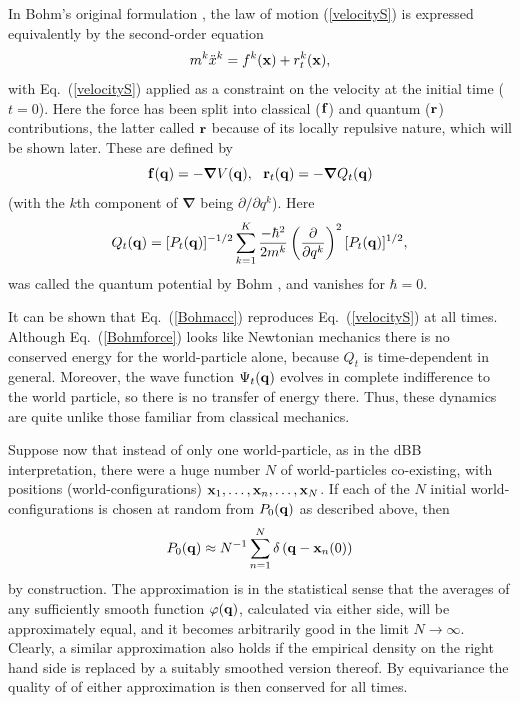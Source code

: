 \documentclass[twocolumn,aps,pra,amsmath,amssymb,superscriptaddress]{revtex4}
\newcommand{\beq}{\begin{equation}}
\newcommand{\eeq}{\end{equation}}
\newcommand{\erf}[1]{Eq.~(\ref{#1})}
\newcommand{\ro}[1]{\left( {#1} \right)}
\renewcommand{\(}{\left(}
\renewcommand{\)}{\right)}
\newcommand{\del}{{\boldsymbol \nabla}}
\newcommand{\du}{\partial}
\newcommand{\dbd}[2]{\frac{\partial{#1}}{\partial{#2}}}
\newcommand{\blk}{\color{black}}
\newcommand{\blu}{\color{blue}}
\renewcommand\blu{\blk}
\begin{document}
 
In Bohm's original formulation \cite{dbb}, the law of motion (\ref{velocityS})  
 is expressed equivalently by the second-order equation 
 \beq
m^k\ddot{x}^k = f^k({\bf x}) + r^k_t({\bf x}),\label{Bohmacc}
\eeq
with \erf{velocityS} applied \blu as \blk a constraint on the velocity at the initial time ($t=0$). \blk 
Here the force has been split into classical (${\bf f}$) and quantum (${\bf r}$)   contributions, 
the latter called ${\bf r}$ because of its locally repulsive nature, which will be shown \blk later. \blk 
These are \blk
 defined by 
\beq
{\bf f}({\bf q})  = - {\del V({\bf q})}, \ \  
{\bf r}_t({\bf q}) =  -{\del  Q_t({\bf q})}   \label{Bohmforce}
\eeq
(with the $k$th component of $\del$ being $\du/{\du q^k}$).
Here 
\beq Q_t({\bf q}) =  [P_{t}({\bf q})]^{-1/2} \sum_{k=1}^K \frac{-\hbar^2}{2m^k} \ro{\dbd{}{q^k}}^2 [P_{t}({\bf q})]^{1/2}, 
\label{eq:quantum-potential} 
\eeq
was called the quantum potential by Bohm \cite{dbb}, \blk and vanishes for $\hbar = 0$. 

It can be shown that \erf{Bohmacc} reproduces \erf{velocityS} at all times. 
Although \erf{Bohmforce} looks like Newtonian mechanics there is no conserved energy for the world-particle  alone, because $Q_t$ is time-dependent in general. Moreover, the wave function $\Psi_{t}({\bf q})$ evolves in complete indifference to the world particle, so there is no transfer of energy there. Thus, these dynamics are quite unlike those familiar from classical mechanics. \blk


Suppose now that instead of only one \blk world-particle, as in the dBB interpretation, 
there  were a huge number ${N}$ of world-particles co-existing, with positions (world-configurations)  
${\bf x}_1, \ldots, {\bf x}_n, \ldots, {\bf x}_N$. If each of the $N$   initial \blk
world-configurations is chosen at random   from $P_0({\bf q})$ \blk
\blk
as described above, then 
\beq \label{p0q}
P_0({\bf q}) \approx N^{-1}\sum_{n=1}^{N}\delta\ro{{\bf q} -{\bf x}_n(0)} 
\eeq
by construction.  The approximation is in the statistical sense that the averages of any sufficiently smooth function ${\varphi}({\bf q})$, calculated via either side, will be approximately equal, and it becomes arbitrarily good in the limit $N\to\infty$.  Clearly, a similar approximation also holds if the empirical density on the right hand side is replaced by a suitably smoothed version thereof.
\blk
By equivariance the quality of   of either \blk approximation is then conserved 
for all times. 
\end{document}
